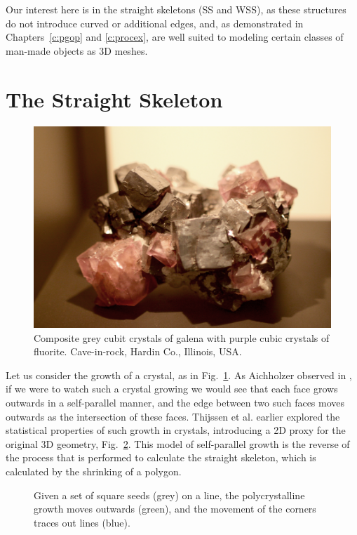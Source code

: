 Our interest here is in the straight skeletons (SS and WSS), as these structures do not introduce curved or additional edges, and, as demonstrated in Chapters~\ref{c:pgop} and \ref{c:procex}, are well suited to modeling certain classes of man-made objects as 3D meshes.

\section{The Straight Skeleton}
\label{sec:ss}

\begin{figure}
  \centering
  \includegraphics[width=1.0\columnwidth]{crystal.png}
  \caption[Purple cubic crystals of fluorite]{\label{fig:crystal}Composite grey cubit crystals of galena with purple cubic crystals of fluorite. Cave-in-rock, Hardin Co., Illinois, USA.}
\end{figure}

Let us consider the growth of a crystal, as in Fig.~\ref{fig:crystal}. As Aichholzer observed in \cite{Aichholzer:1996:SKF}, if we were to watch such a crystal growing we would see that each face grows outwards in a self-parallel manner, and the edge between two such faces moves outwards as the intersection of these faces. Thijssen et al.\cite{Thijssen92} earlier explored the statistical properties of such growth in crystals, introducing a 2D proxy for the original 3D geometry, Fig.~\ref{fig:skel_crystal}. This model of self-parallel growth is the reverse of the process that is performed to calculate the straight skeleton, which is calculated by the shrinking of a polygon.

\begin{figure}
  \centering
  \def\svgwidth{1.\columnwidth}
  
  \caption[2D crystal growth.]{\label{fig:skel_crystal} Given a set of square seeds (grey) on a line, the polycrystalline growth moves outwards (green), and the movement of the corners traces out lines (blue).}
\end{figure}

